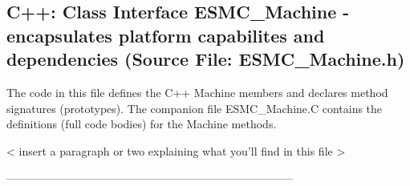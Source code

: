  
\parskip        0pt
\parindent      0pt
\baselineskip  11pt
 
\def\bv{\begin{verbatim}}
\def\ev{\end{verbatim}}
\def\be{\begin{equation}}
\def\ee{\end{equation}}
\def\bea{\begin{eqnarray}}
\def\eea{\end{eqnarray}}
\def\bi{\begin{itemize}}
\def\ei{\end{itemize}}
\def\bn{\begin{enumerate}}
\def\en{\end{enumerate}}
\def\bd{\begin{description}}
\def\ed{\end{description}}
\def\({\left (}
\def\){\right )}
\def\[{\left [}
\def\]{\right ]}
\def\<{\left  \langle}
\def\>{\right \rangle}
\def\cI{{\cal I}}
\def\diag{\mathop{\rm diag}}
\def\tr{\mathop{\rm tr}}


 
\subsection{C++:  Class Interface ESMC\_Machine - encapsulates platform capabilites and dependencies (Source File: ESMC\_Machine.h)}


  
  
   The code in this file defines the C++ Machine members and declares method 
   signatures (prototypes).  The companion file ESMC\_Machine.C contains
   the definitions (full code bodies) for the Machine methods.
  
   < insert a paragraph or two explaining what you'll find in this file >
  
  -----------------------------------------------------------------------------
   

